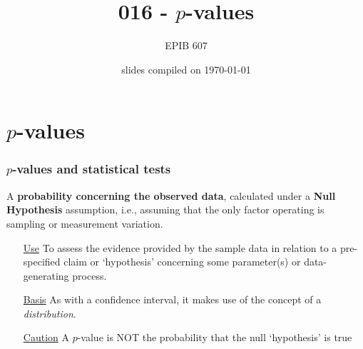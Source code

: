 \documentclass[10pt,handout]{beamer}\usepackage[]{graphicx}\usepackage[]{color}
\begin{document}
	
	
	


\title{016 - $p$-values}
\author{EPIB 607}

\date{slides compiled on \today}

\maketitle

\section{$p$-values}
\begin{frame}
	\frametitle{$p$-values and statistical tests}
	
	
	\begin{definition}[$p$-value]
		A \textbf{probability concerning the observed data}, calculated under a \textbf{Null Hypothesis} assumption, i.e., assuming that the only factor operating is sampling or measurement variation. 
	\end{definition}
	
	\begin{itemize} 
		\item[\underline{Use}] To assess the evidence provided by the sample data
		in relation to a pre-specified claim or `hypothesis' concerning some parameter(s) or data-generating process. 
		\item[\underline{Basis}] As with a confidence interval, it makes use of the concept of a \textit{distribution}. 
		\item[\underline{Caution}] A $p$-value is NOT the probability that the null `hypothesis' is true
	\end{itemize}
\end{frame}
\end{document}
